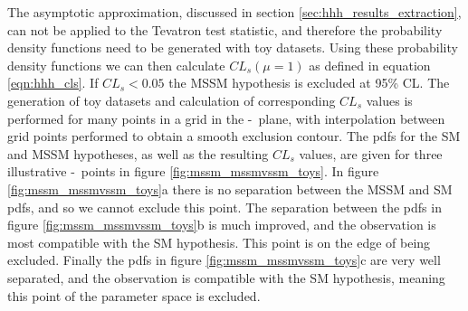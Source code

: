 The asymptotic approximation, discussed in section \ref{sec:hhh_results_extraction}, can not be applied
to the Tevatron test statistic, and therefore the probability density functions need to be generated 
with toy datasets. Using these probability density functions  we can then calculate $CL_s(\mu=1)$ as defined in equation \ref{eqn:hhh_cls}.
If $CL_s < 0.05$ the MSSM hypothesis is excluded at 95\% CL. The generation of toy datasets and 
calculation of corresponding $CL_s$ values is performed for many points in a grid in the \mA-\tanb~plane,
with interpolation between grid points performed to obtain a smooth exclusion contour.
The pdfs for the SM and MSSM hypotheses, as well as the resulting $CL_s$ values,
are given for three illustrative \mA-\tanb~points in figure \ref{fig:mssm_mssmvssm_toys}. In figure \ref{fig:mssm_mssmvssm_toys}a
there is no separation between the MSSM and SM pdfs, and so we cannot exclude this point. The separation
between the pdfs in figure \ref{fig:mssm_mssmvssm_toys}b is much improved, and the observation is most compatible
with the SM hypothesis. This point is on the edge of being excluded. Finally the pdfs in figure \ref{fig:mssm_mssmvssm_toys}c
are very well separated, and the observation is compatible with the SM hypothesis, meaning this point of the parameter space is excluded.

